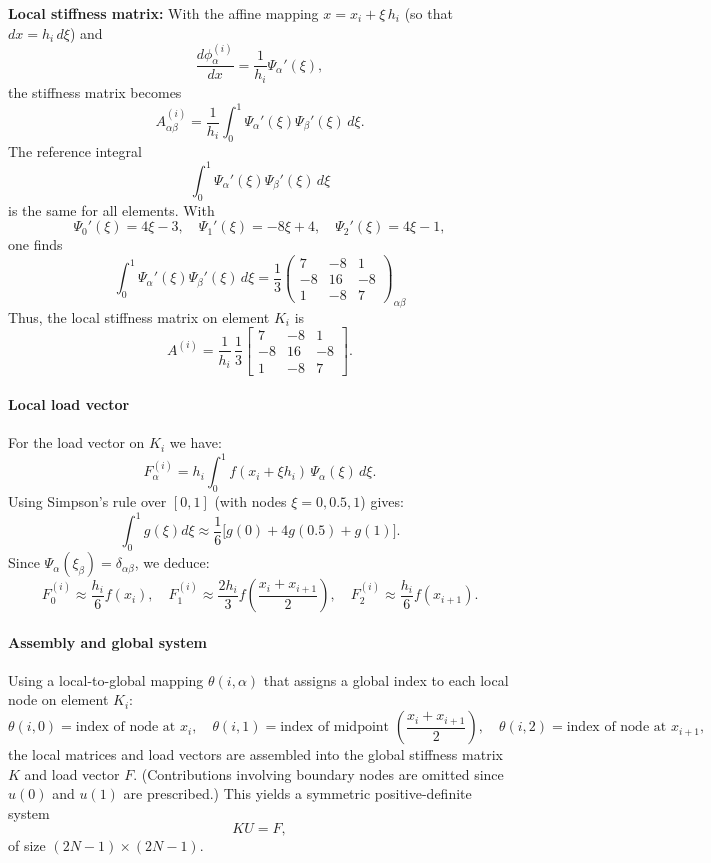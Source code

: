 \documentclass{article}
\begin{document}
\textbf{Local stiffness matrix:} With the affine mapping \(x=x_i+\xi\,h_i\) (so that \(dx=h_i\,d\xi\)) and
\[
	\frac{d\phi_\alpha^{(i)}}{dx}=\frac{1}{h_i}\Psi_\alpha'(\xi),
\]
the stiffness matrix becomes
\[
	A^{(i)}_{\alpha\beta}=\frac{1}{h_i}\int_0^1 \Psi_\alpha'(\xi)\Psi_\beta'(\xi)\,d\xi.
\]
The reference integral
\[
	\int_0^1 \Psi_\alpha'(\xi)\Psi_\beta'(\xi)\,d\xi
\]
is the same for all elements. With
\[
	\Psi_0'(\xi)=4\xi-3,\quad \Psi_1'(\xi)=-8\xi+4,\quad \Psi_2'(\xi)=4\xi-1,
\]
one finds
\[
	\int_0^1 \Psi_\alpha'(\xi)\Psi_\beta'(\xi)\,d\xi = \frac{1}{3}
	\begin{pmatrix}
		7  & -8 & 1  \\[1mm]
		-8 & 16 & -8 \\[1mm]
		1  & -8 & 7
	\end{pmatrix}_{\alpha\beta}
\]
Thus, the local stiffness matrix on element \(K_i\) is
\[
	A^{(i)}=\frac{1}{h_i}\,\frac{1}{3}
	\begin{bmatrix}
		7  & -8 & 1  \\[1mm]
		-8 & 16 & -8 \\[1mm]
		1  & -8 & 7
	\end{bmatrix}.
\]

\paragraph{Local load vector}
For the load vector on \(K_i\) we have:
\[
	F^{(i)}_\alpha=h_i\int_0^1 f(x_i+\xi h_i)\,\Psi_\alpha(\xi)\,d\xi.
\]
Using Simpson's rule over \([0,1]\) (with nodes \(\xi=0,0.5,1\)) gives:
\[
	\int_0^1 g(\xi)d\xi\approx \frac{1}{6}\Big[g(0)+4g(0.5)+g(1)\Big].
\]
Since \(\Psi_\alpha(\xi_\beta)=\delta_{\alpha\beta}\), we deduce:
\[
	F^{(i)}_0\approx \frac{h_i}{6}f(x_i),\quad
	F^{(i)}_1\approx \frac{2h_i}{3}f\!\left(\frac{x_i+x_{i+1}}{2}\right),\quad
	F^{(i)}_2\approx \frac{h_i}{6}f(x_{i+1}).
\]

\paragraph{Assembly and global system}
Using a local-to-global mapping \(\theta(i,\alpha)\) that assigns a global index to each local node on element \(K_i\):
\[
	\theta(i,0) = \text{index of node at } x_i,\quad
	\theta(i,1) = \text{index of midpoint } \left(\frac{x_i+x_{i+1}}{2}\right),\quad
	\theta(i,2) = \text{index of node at } x_{i+1},
\]
the local matrices and load vectors are assembled into the global stiffness matrix \(K\) and load vector \(F\). (Contributions involving boundary nodes are omitted since \(u(0)\) and \(u(1)\) are prescribed.) This yields a symmetric positive-definite system
\[
	KU=F,
\]
of size \((2N-1)\times(2N-1)\).
\end{document}

